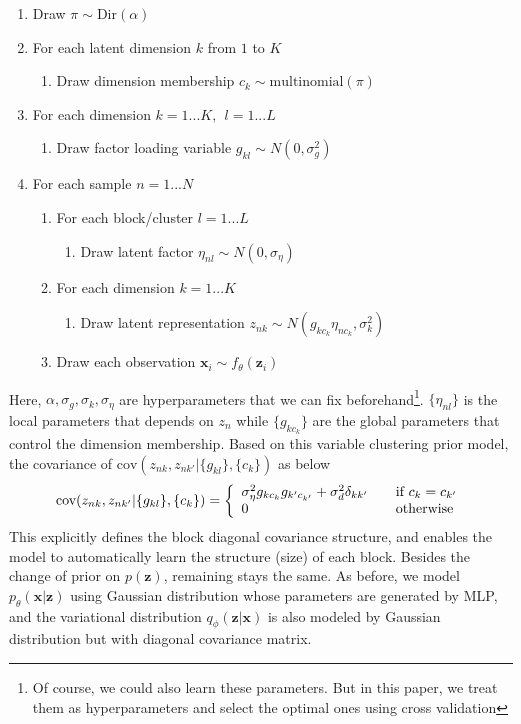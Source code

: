 \begin{enumerate}[noitemsep]
\item Draw $\pi\sim \text{Dir}(\alpha)$
\item For each latent dimension $k$ from $1$ to $K$
    \begin{enumerate}[noitemsep]
    \item Draw dimension membership $c_k\sim \text{multinomial}(\pi)$
    \end{enumerate}
\item For each dimension $k=1...K, ~~l=1...L$
    \begin{enumerate}[noitemsep]
    \item Draw factor loading variable $g_{kl}\sim N(0, \sigma_g^2)$
    \end{enumerate}
\item For each sample $n=1...N$
    \begin{enumerate}[noitemsep]
        \item For each block/cluster $l=1...L$
        \begin{enumerate}
            \item Draw latent factor $\eta_{nl}\sim N(0, \sigma_{\eta})$
        \end{enumerate}
        \item For each dimension $k=1...K$
        \begin{enumerate}
            \item Draw latent representation $z_{nk}\sim N(g_{kc_k}\eta_{nc_k}, \sigma_k^2)$
        \end{enumerate}
        \item Draw each observation $\mathbf{x}_i \sim f_{\theta}(\mathbf{z}_i)$
    \end{enumerate}
\end{enumerate}

Here, $\alpha, \sigma_g, \sigma_k, \sigma_{\eta}$ are hyperparameters that we can fix beforehand\footnote{Of course, we could also learn these parameters. But in this paper, we treat them as hyperparameters and select the optimal ones using cross validation}. $\{\eta_{nl}\}$ is the local parameters that depends on $z_n$ while $\{g_{kc_k}\}$ are the global parameters that control the dimension membership. Based on this variable clustering prior model, the covariance of $\text{cov}(z_{nk}, z_{nk'}|\{g_{kl}\}, \{c_k\})$ as below
\[ \text{cov}(z_{nk}, z_{nk'}|\{g_{kl}\}, \{c_k\}) = \left\{
  \begin{array}{l l}
    \sigma_{\eta}^2g_{kc_k}g_{k'c_{k'}}+\sigma_d^2\delta_{kk'} & \quad \text{if $c_k=c_{k'}$}\\
    0 & \quad \text{otherwise}
  \end{array} \right.\]
This explicitly defines the block diagonal covariance structure, and enables the model to automatically learn the structure (size) of each block.  Besides the change of prior on $p(\mathbf{z})$, remaining stays the same. As before, we model $p_{\theta}(\mathbf{x}|\mathbf{z})$ using Gaussian distribution whose parameters are generated by MLP, and the variational distribution $q_{\phi}(\mathbf{z}|\mathbf{x})$ is also modeled by Gaussian distribution but with diagonal covariance matrix.

